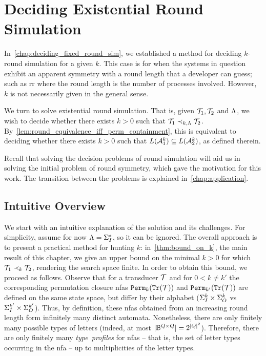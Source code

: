 \chapter{Deciding Existential Round Simulation}
\label{chap:deciding_existential_round_sim}

In~\cref{chap:deciding_fixed_round_sim}, we established a method for deciding $k$-round simulation for a given $k$. This case is for when the systems in question exhibit an apparent symmetry with a round length that a developer can guess; such as \gls{rr} where the round length is the number of processes involved. However, $k$ is not necessarily given in the general sense.

We turn to solve existential round simulation. That is, given $\mathcal{T}_1,\mathcal{T}_2$ and $\Lambda$, we wish to decide whether there exists $k>0$ such that $\mathcal{T}_1\prec_{k,\Lambda} \mathcal{T}_2$. 
By~\cref{lem:round_equivalence_iff_perm_containment}, this is equivalent to deciding whether there exists $k>0$ such that $L(\mathcal{A}^k_1)\subseteq L(\mathcal{A}^k_2)$, as defined therein.

Recall that solving the decision problems of round simulation will aid us in solving the initial problem of round symmetry, which gave the motivation for this work. The transition between the problems is explained in~\cref{chap:application}.

\section{Intuitive Overview}
\label{sec:intuitive_overview}
We start with an intuitive explanation of the solution and its challenges. For simplicity, assume for now $\Lambda=\Sigma_{I}^*$, so it can be ignored. The overall approach is to present a practical method for hunting $k$: in~\cref{thm:bound_on_k}, the main result of this chapter, we give an upper bound on the minimal $k>0$ for which $\mathcal{T}_1\prec_{k} \mathcal{T}_2$, rendering the search space finite. In order to obtain this bound, we proceed as follows. Observe that for a transducer $\mathcal{T}$ and for $0<k\neq k'$ the corresponding permutation closure \glspl{nfa} ${\mathtt{Perm}}_k({\mathtt{Tr}}(\mathcal{T}))$ and ${\mathtt{Perm}}_{k'}({\mathtt{Tr}}(\mathcal{T}))$ are defined on the same state space, but differ by their alphabet ($\Sigma_{I}^{k}\times \Sigma_{O}^{k}$ vs $\Sigma_{I}^{k'}\times \Sigma_{O}^{k'}$). Thus, by definition, these \glspl{nfa} obtained from an increasing round length form infinitely many distinct automata. Nonetheless, there are only finitely many possible types of letters (indeed, at most $|\mathbb{B}^{Q\times Q}|=2^{|Q|^2}$). Therefore, there are only finitely many \emph{type~profiles} for \glspl{nfa} -- that is, the set of letter types occurring in the \gls{nfa} -- up to multiplicities of the letter types.


